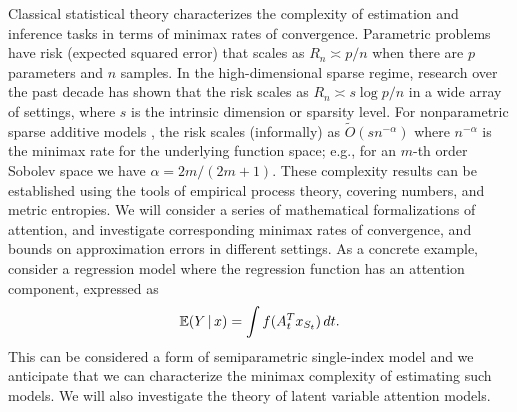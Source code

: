 Classical statistical theory characterizes the complexity of
estimation and inference tasks in terms of minimax rates of
convergence. Parametric problems have risk (expected squared error)
that scales as $R_n \asymp p/n$ when there are $p$ parameters and $n$
samples. In the high-dimensional sparse regime, research over the past
decade has shown that the risk scales as $R_n \asymp s \log p/n$ 
in a wide array of settings, where $s$ is the intrinsic dimension or
sparsity level. For nonparametric sparse additive
models \citep{Ravikumar:08}, the risk
scales (informally) as $\tilde O(s n^{-\alpha})$ where $n^{-\alpha}$ is 
the minimax rate for the underlying function space;
e.g., for an $m$-th order Sobolev space we have
$\alpha = 2m/(2m+1)$. These complexity results can be established using
the tools of empirical process theory, covering numbers, and metric
entropies. We will consider a series of mathematical formalizations
of attention, and investigate corresponding minimax rates of 
convergence, and bounds on approximation errors in different settings.
As a concrete example, consider a regression model where the regression function 
has an attention component, expressed as 
\vskip-10pt
$$ \mbox{$\mathbb{E}$}(Y\,|\, x) = \int f(A_t^T x_{S_t}) \, dt.$$
This can be considered a form of semiparametric single-index model
\citep{horowitz09,horowitz96,ichimura93,kakade11,negahban12} 
and we anticipate that we can characterize
the minimax complexity of estimating such models. We will also investigate
the theory of latent variable attention models.





 
